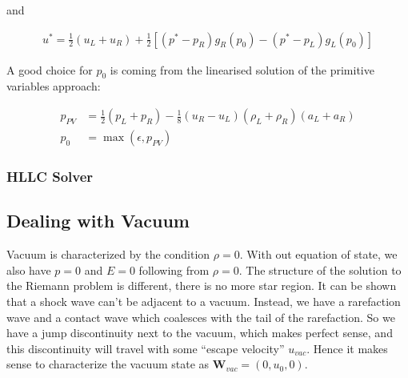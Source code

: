 and

\begin{align*}
	u^*  = \frac{1}{2} (u_L + u_R) + \frac{1}{2} \left[ (p^* - p_R) g_R(p_0) - (p^* - p_L) g_L(p_0) \right]
\end{align*}


A good choice for $p_0$ is coming from the linearised solution of the primitive variables approach:

\begin{align*}
	p_{PV} &= \frac{1}{2} (p_L + p_R) - \frac{1}{8} (u_R - u_L)(\rho_L + \rho_R)(a_L + a_R)\\
	p_0 &= \max(\epsilon, p_{PV})
\end{align*}










\subsubsection{HLLC Solver}













\subsection{Dealing with Vacuum}


Vacuum is characterized by the condition $\rho = 0$.
With out equation of state, we also have $p = 0$ and $E = 0$ following from $\rho = 0$.
The structure of the solution to the Riemann problem is different, there is no more star region.
It can be shown that a shock wave can't be adjacent to a vacuum.
Instead, we have a rarefaction wave and a contact wave which coalesces with the tail of the rarefaction.
So we have a jump discontinuity next to the vacuum, which makes perfect sense, and this discontinuity will travel with some ``escape velocity'' $u_{vac}$.
Hence it makes sense to characterize the vacuum state as $\mathbf{W}_{vac} = (0, u_0, 0)$.

